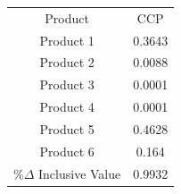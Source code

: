 \begin{tabular}{cc}
Product & CCP \\
Product 1 & 0.3643 \\
Product 2 & 0.0088 \\
Product 3 & 0.0001 \\
Product 4 & 0.0001 \\
Product 5 & 0.4628 \\
Product 6 & 0.164 \\
$\%\Delta$ Inclusive Value & 0.9932 \\
\end{tabular}